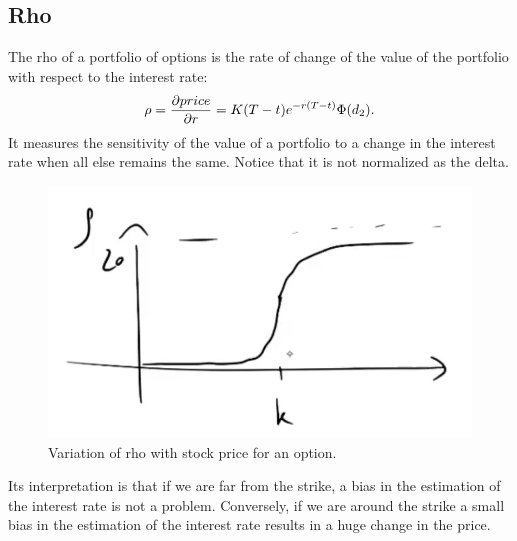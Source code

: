 \subsection{Rho}
The rho of a portfolio of options is the rate of change of the value of the portfolio with respect to the interest rate:
\begin{equation}
    \rho = \pdv{price}{r} = K(T-t)e^{-r(T-t)}\Phi(d_2).
\end{equation}
It measures the sensitivity of the value of a portfolio to a change in the interest rate when all else remains the same. Notice that it is not normalized as the delta.
\begin{figure}[htp]
    \centering
    \includegraphics[scale=0.3]{fig/tmp/fig15.png}
    \caption{Variation of rho with stock price for an option.}
    \label{fig:rho}
\end{figure}
\newline Its interpretation is that if we are far from the strike, a bias in the estimation of the interest rate is not a problem. Conversely, if we are around the strike a small bias in the estimation of the interest rate results in a huge change in the price.


